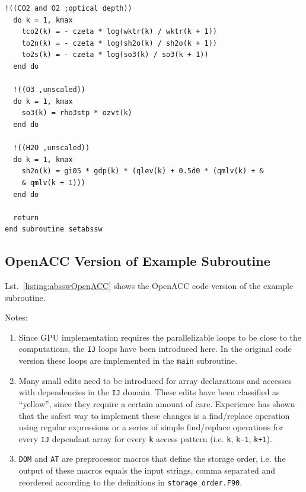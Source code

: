 \begin{lstlisting}[name=absswOpenACC, label=listing:absswOriginal, caption={Example ASUCA subroutine (original CPU optimized version).}]
  !((CO2 and O2 ;optical depth))
  do k = 1, kmax
    tco2(k) = - czeta * log(wktr(k) / wktr(k + 1))
    to2n(k) = - czeta * log(sh2o(k) / sh2o(k + 1))
    to2s(k) = - czeta * log(so3(k) / so3(k + 1))
  end do

  !((O3 ,unscaled))
  do k = 1, kmax
    so3(k) = rho3stp * ozvt(k)
  end do

  !((H2O ,unscaled))
  do k = 1, kmax
    sh2o(k) = gi05 * gdp(k) * (qlev(k) + 0.5d0 * (qmlv(k) + &
    & qmlv(k + 1)))
  end do

  return
end subroutine setabssw
\end{lstlisting}

\subsection{OpenACC Version of Example Subroutine}

Lst.~\ref{listing:absswOpenACC} shows the OpenACC code version of the example subroutine.

Notes:
\begin{enumerate}
 \item Since GPU implementation requires the parallelizable loops to be close to the computations, the \verb|IJ| loops have been introduced here. In the original code version these loops are implemented in the \verb|main| subroutine.
 \item Many small edits need to be introduced for array declarations and accesses with dependencies in the \verb|IJ| domain. These edits have been classified as \textquotedblleft yellow\textquotedblright, since they require a certain amount of care. Experience has shown that the safest way to implement these changes is a find/replace operation using regular expressions or a series of simple find/replace operations for every \verb|IJ| dependant array for every \verb|k| access pattern (i.e. \verb|k|, \verb|k-1|, \verb|k+1|).
 \item \verb|DOM| and \verb|AT| are preprocessor macros that define the storage order, i.e. the output of these macros equals the input strings, comma separated and reordered according to the definitions in \verb|storage_order.F90|.
\end{enumerate}

